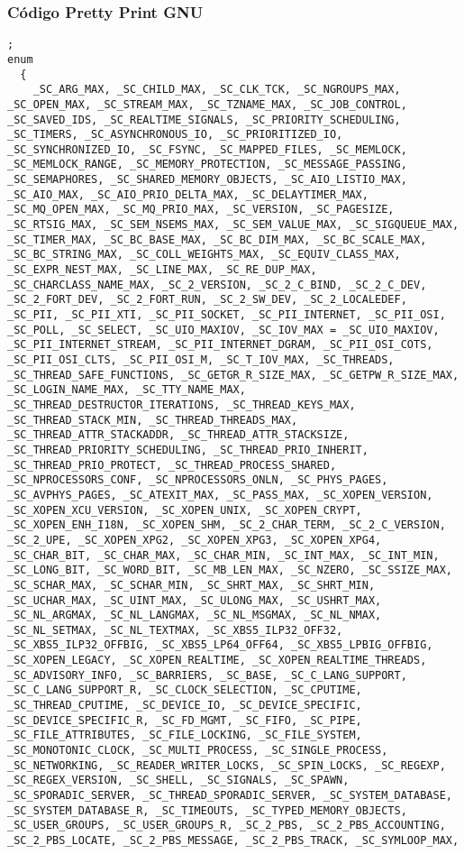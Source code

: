 \documentclass{beamer}
\begin{document}
\begin{frame}[fragile]
\frametitle{C\'odigo Pretty Print GNU}
\begin{verbatim}
;
enum
  {
    _SC_ARG_MAX, _SC_CHILD_MAX, _SC_CLK_TCK, _SC_NGROUPS_MAX, _SC_OPEN_MAX, _SC_STREAM_MAX, _SC_TZNAME_MAX, _SC_JOB_CONTROL, _SC_SAVED_IDS, _SC_REALTIME_SIGNALS, _SC_PRIORITY_SCHEDULING, _SC_TIMERS, _SC_ASYNCHRONOUS_IO, _SC_PRIORITIZED_IO, _SC_SYNCHRONIZED_IO, _SC_FSYNC, _SC_MAPPED_FILES, _SC_MEMLOCK, _SC_MEMLOCK_RANGE, _SC_MEMORY_PROTECTION, _SC_MESSAGE_PASSING, _SC_SEMAPHORES, _SC_SHARED_MEMORY_OBJECTS, _SC_AIO_LISTIO_MAX, _SC_AIO_MAX, _SC_AIO_PRIO_DELTA_MAX, _SC_DELAYTIMER_MAX, _SC_MQ_OPEN_MAX, _SC_MQ_PRIO_MAX, _SC_VERSION, _SC_PAGESIZE, _SC_RTSIG_MAX, _SC_SEM_NSEMS_MAX, _SC_SEM_VALUE_MAX, _SC_SIGQUEUE_MAX, _SC_TIMER_MAX, _SC_BC_BASE_MAX, _SC_BC_DIM_MAX, _SC_BC_SCALE_MAX, _SC_BC_STRING_MAX, _SC_COLL_WEIGHTS_MAX, _SC_EQUIV_CLASS_MAX, _SC_EXPR_NEST_MAX, _SC_LINE_MAX, _SC_RE_DUP_MAX, _SC_CHARCLASS_NAME_MAX, _SC_2_VERSION, _SC_2_C_BIND, _SC_2_C_DEV, _SC_2_FORT_DEV, _SC_2_FORT_RUN, _SC_2_SW_DEV, _SC_2_LOCALEDEF, _SC_PII, _SC_PII_XTI, _SC_PII_SOCKET, _SC_PII_INTERNET, _SC_PII_OSI, _SC_POLL, _SC_SELECT, _SC_UIO_MAXIOV, _SC_IOV_MAX = _SC_UIO_MAXIOV, _SC_PII_INTERNET_STREAM, _SC_PII_INTERNET_DGRAM, _SC_PII_OSI_COTS, _SC_PII_OSI_CLTS, _SC_PII_OSI_M, _SC_T_IOV_MAX, _SC_THREADS, _SC_THREAD_SAFE_FUNCTIONS, _SC_GETGR_R_SIZE_MAX, _SC_GETPW_R_SIZE_MAX, _SC_LOGIN_NAME_MAX, _SC_TTY_NAME_MAX, _SC_THREAD_DESTRUCTOR_ITERATIONS, _SC_THREAD_KEYS_MAX, _SC_THREAD_STACK_MIN, _SC_THREAD_THREADS_MAX, _SC_THREAD_ATTR_STACKADDR, _SC_THREAD_ATTR_STACKSIZE, _SC_THREAD_PRIORITY_SCHEDULING, _SC_THREAD_PRIO_INHERIT, _SC_THREAD_PRIO_PROTECT, _SC_THREAD_PROCESS_SHARED, _SC_NPROCESSORS_CONF, _SC_NPROCESSORS_ONLN, _SC_PHYS_PAGES, _SC_AVPHYS_PAGES, _SC_ATEXIT_MAX, _SC_PASS_MAX, _SC_XOPEN_VERSION, _SC_XOPEN_XCU_VERSION, _SC_XOPEN_UNIX, _SC_XOPEN_CRYPT, _SC_XOPEN_ENH_I18N, _SC_XOPEN_SHM, _SC_2_CHAR_TERM, _SC_2_C_VERSION, _SC_2_UPE, _SC_XOPEN_XPG2, _SC_XOPEN_XPG3, _SC_XOPEN_XPG4, _SC_CHAR_BIT, _SC_CHAR_MAX, _SC_CHAR_MIN, _SC_INT_MAX, _SC_INT_MIN, _SC_LONG_BIT, _SC_WORD_BIT, _SC_MB_LEN_MAX, _SC_NZERO, _SC_SSIZE_MAX, _SC_SCHAR_MAX, _SC_SCHAR_MIN, _SC_SHRT_MAX, _SC_SHRT_MIN, _SC_UCHAR_MAX, _SC_UINT_MAX, _SC_ULONG_MAX, _SC_USHRT_MAX, _SC_NL_ARGMAX, _SC_NL_LANGMAX, _SC_NL_MSGMAX, _SC_NL_NMAX, _SC_NL_SETMAX, _SC_NL_TEXTMAX, _SC_XBS5_ILP32_OFF32, _SC_XBS5_ILP32_OFFBIG, _SC_XBS5_LP64_OFF64, _SC_XBS5_LPBIG_OFFBIG, _SC_XOPEN_LEGACY, _SC_XOPEN_REALTIME, _SC_XOPEN_REALTIME_THREADS, _SC_ADVISORY_INFO, _SC_BARRIERS, _SC_BASE, _SC_C_LANG_SUPPORT, _SC_C_LANG_SUPPORT_R, _SC_CLOCK_SELECTION, _SC_CPUTIME, _SC_THREAD_CPUTIME, _SC_DEVICE_IO, _SC_DEVICE_SPECIFIC, _SC_DEVICE_SPECIFIC_R, _SC_FD_MGMT, _SC_FIFO, _SC_PIPE, _SC_FILE_ATTRIBUTES, _SC_FILE_LOCKING, _SC_FILE_SYSTEM, _SC_MONOTONIC_CLOCK, _SC_MULTI_PROCESS, _SC_SINGLE_PROCESS, _SC_NETWORKING, _SC_READER_WRITER_LOCKS, _SC_SPIN_LOCKS, _SC_REGEXP, _SC_REGEX_VERSION, _SC_SHELL, _SC_SIGNALS, _SC_SPAWN, _SC_SPORADIC_SERVER, _SC_THREAD_SPORADIC_SERVER, _SC_SYSTEM_DATABASE, _SC_SYSTEM_DATABASE_R, _SC_TIMEOUTS, _SC_TYPED_MEMORY_OBJECTS, _SC_USER_GROUPS, _SC_USER_GROUPS_R, _SC_2_PBS, _SC_2_PBS_ACCOUNTING, _SC_2_PBS_LOCATE, _SC_2_PBS_MESSAGE, _SC_2_PBS_TRACK, _SC_SYMLOOP_MAX, 
\end{verbatim}
\end{frame}
\end{document}
